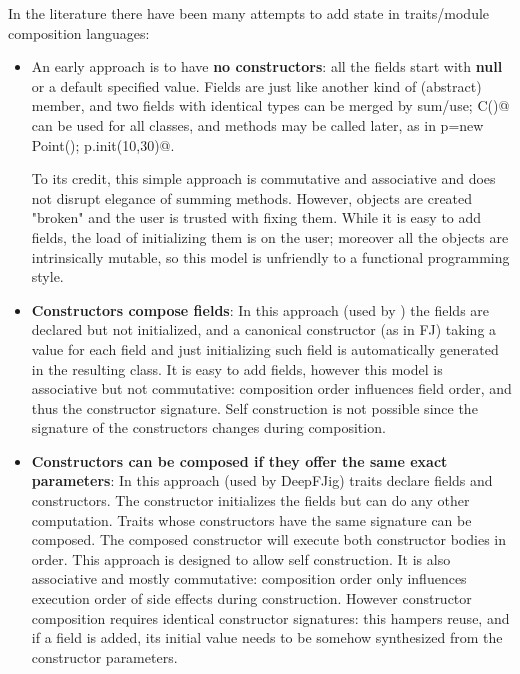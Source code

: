 In the literature there have been many attempts to add state in traits/module composition languages:
\begin{itemize}  
\item An early approach is to have {\bf no constructors}: all the fields start with {\bf null} or a default specified value.
  Fields are just like another kind of (abstract) member, and two fields
  with identical types can be merged by sum/use; \Q@new C()@ can be used for all classes, and \Q@init@ methods may be called later, as in
  \Q@Point p=new Point(); p.init(10,30)@.
  
  To its credit, this simple approach is commutative and associative and does not disrupt elegance of summing methods.
  However, objects are created "broken" and the user is trusted with fixing them.
  While it is easy to add fields, the load of initializing them is on the user; moreover
    all the objects are intrinsically mutable, so this model is unfriendly
    to a functional programming style.
\item {\bf Constructors compose fields}:
In this approach (used by \cite{fjig}) the fields are declared but not initialized, and
a canonical constructor (as in FJ) taking a value for each field and just initializing such field
is automatically generated in the resulting class.
It is easy to add fields, however this model is associative but not commutative: composition order influences field order, and thus the constructor signature.
Self construction is not possible 
since the signature of the constructors changes during composition.

\item {\bf Constructors can be composed if they offer the same exact parameters}:
In this approach (used by DeepFJig) traits declare fields and constructors.
The constructor initializes the fields but can do any other computation.
Traits whose constructors have the same signature can be composed.
The composed constructor will execute both constructor bodies in order.
This approach is designed to allow self construction.
It is also associative and mostly commutative: composition order only influences execution order of side effects during construction.
However constructor composition requires identical constructor signatures: this
hampers reuse, and if a field is added, its initial value needs to be
somehow synthesized from the constructor parameters.

\end{itemize}

